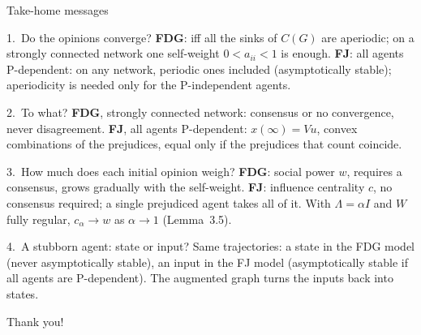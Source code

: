 \documentclass[10pt, aspectratio=169]{beamer}
\newcommand{\compactblocks}{\setbeamerfont{block title}{size=\small}}
\begin{document}
\begin{frame}[label=m-messages]{Take-home messages}
  \compactblocks
  \begin{alertblock}{1.\ Do the opinions converge?}
    \footnotesize \textbf{FDG}: iff all the sinks of $C(G)$ are aperiodic; on a strongly
    connected network one self-weight $0 < a_{ii} < 1$ is enough. \textbf{FJ}: all agents
    P-dependent: on any network, periodic ones included (asymptotically stable); aperiodicity is
    needed only for the P-independent agents.
  \end{alertblock}
  \begin{alertblock}{2.\ To what?}
    \footnotesize \textbf{FDG}, strongly connected network: consensus or no convergence, never
    disagreement. \textbf{FJ}, all agents P-dependent: $x(\infty) = Vu$, convex combinations of
    the prejudices, equal only if the prejudices that count coincide.
  \end{alertblock}
  \begin{alertblock}{3.\ How much does each initial opinion weigh?}
    \footnotesize \textbf{FDG}: social power $w$, requires a consensus, grows gradually with the
    self-weight. \textbf{FJ}: influence centrality $c$, no consensus required; a single
    prejudiced agent takes all of it. With $\Lambda = \alpha I$ and $W$ fully regular,
    $c_\alpha \to w$ as $\alpha \to 1$ (Lemma~3.5).
  \end{alertblock}
  \begin{alertblock}{4.\ A stubborn agent: state or input?}
    \footnotesize Same trajectories: a state in the FDG model (never asymptotically stable), an
    input in the FJ model (asymptotically stable if all agents are P-dependent). The augmented
    graph turns the inputs back into states.
  \end{alertblock}
\end{frame}

\begin{emptyframe}
  Thank you!
\end{emptyframe}

\appendix


\end{document}
